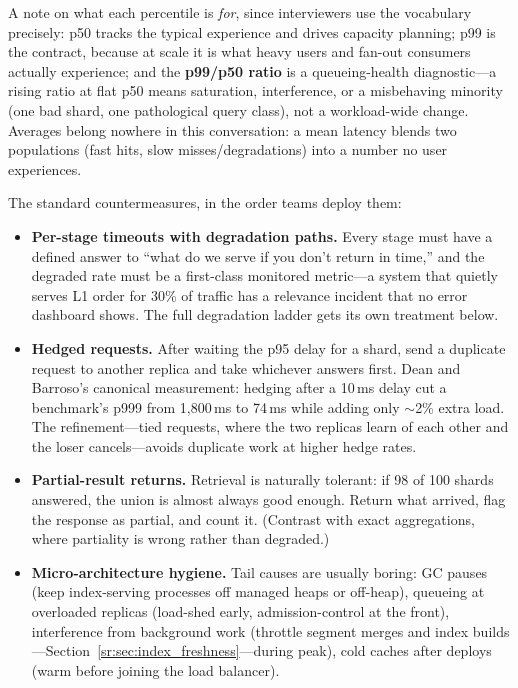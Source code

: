 A note on what each percentile is \textit{for}, since interviewers use the vocabulary precisely: p50 tracks the typical experience and drives capacity planning; p99 is the contract, because at scale it is what heavy users and fan-out consumers actually experience; and the \textbf{p99/p50 ratio} is a queueing-health diagnostic---a rising ratio at flat p50 means saturation, interference, or a misbehaving minority (one bad shard, one pathological query class), not a workload-wide change. Averages belong nowhere in this conversation: a mean latency blends two populations (fast hits, slow misses/degradations) into a number no user experiences.

The standard countermeasures, in the order teams deploy them:

\begin{itemize}
    \item \textbf{Per-stage timeouts with degradation paths.} Every stage must have a defined answer to ``what do we serve if you don't return in time,'' and the degraded rate must be a first-class monitored metric---a system that quietly serves L1 order for 30\% of traffic has a relevance incident that no error dashboard shows. The full degradation ladder gets its own treatment below.
    \item \textbf{Hedged requests.} After waiting the p95 delay for a shard, send a duplicate request to another replica and take whichever answers first. Dean and Barroso's canonical measurement: hedging after a 10\,ms delay cut a benchmark's p999 from 1{,}800\,ms to 74\,ms while adding only $\sim$2\% extra load. The refinement---tied requests, where the two replicas learn of each other and the loser cancels---avoids duplicate work at higher hedge rates.
    \item \textbf{Partial-result returns.} Retrieval is naturally tolerant: if 98 of 100 shards answered, the union is almost always good enough. Return what arrived, flag the response as partial, and count it. (Contrast with exact aggregations, where partiality is wrong rather than degraded.)
    \item \textbf{Micro-architecture hygiene.} Tail causes are usually boring: GC pauses (keep index-serving processes off managed heaps or off-heap), queueing at overloaded replicas (load-shed early, admission-control at the front), interference from background work (throttle segment merges and index builds---Section~\ref{sr:sec:index_freshness}---during peak), cold caches after deploys (warm before joining the load balancer).
\end{itemize}

